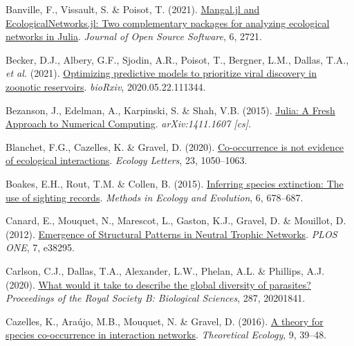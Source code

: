 \documentclass[11pt]{article}
\newlength{\cslhangindent}
\newenvironment{CSLReferences}[3] %
 {%
  \setlength{\parindent}{0pt}
  \ifodd #1 \everypar{\setlength{\hangindent}{\cslhangindent}}\ignorespaces\fi
  \ifnum #2 > 0
  \setlength{\parskip}{#2\baselineskip}
  \fi
 }%
 {}
\begin{document}
\hypertarget{refs}{}
\begin{CSLReferences}{1}{0}
\leavevmode{}%
Banville, F., Vissault, S. \& Poisot, T. (2021).
\href{https://doi.org/10.21105/joss.02721}{Mangal.jl and
EcologicalNetworks.jl: Two complementary packages for analyzing
ecological networks in Julia}. \emph{Journal of Open Source Software},
6, 2721.

\leavevmode{}%
Becker, D.J., Albery, G.F., Sjodin, A.R., Poisot, T., Bergner, L.M.,
Dallas, T.A., \emph{et al.} (2021).
\href{https://doi.org/10.1101/2020.05.22.111344}{Optimizing predictive
models to prioritize viral discovery in zoonotic reservoirs}.
\emph{bioRxiv}, 2020.05.22.111344.

\leavevmode{}%
Bezanson, J., Edelman, A., Karpinski, S. \& Shah, V.B. (2015).
\href{https://arxiv.org/abs/1411.1607}{Julia: A Fresh Approach to
Numerical Computing}. \emph{arXiv:1411.1607 {[}cs{]}}.

\leavevmode{}%
Blanchet, F.G., Cazelles, K. \& Gravel, D. (2020).
\href{https://doi.org/10.1111/ele.13525}{Co-occurrence is not evidence
of ecological interactions}. \emph{Ecology Letters}, 23, 1050--1063.

\leavevmode{}%
Boakes, E.H., Rout, T.M. \& Collen, B. (2015).
\href{https://doi.org/10.1111/2041-210X.12365}{Inferring species
extinction: The use of sighting records}. \emph{Methods in Ecology and
Evolution}, 6, 678--687.

\leavevmode{}%
Canard, E., Mouquet, N., Marescot, L., Gaston, K.J., Gravel, D. \&
Mouillot, D. (2012).
\href{https://doi.org/10.1371/journal.pone.0038295}{Emergence of
Structural Patterns in Neutral Trophic Networks}. \emph{PLOS ONE}, 7,
e38295.

\leavevmode{}%
Carlson, C.J., Dallas, T.A., Alexander, L.W., Phelan, A.L. \& Phillips,
A.J. (2020). \href{https://doi.org/10.1098/rspb.2020.1841}{What would it
take to describe the global diversity of parasites?} \emph{Proceedings
of the Royal Society B: Biological Sciences}, 287, 20201841.

\leavevmode{}%
Cazelles, K., Araújo, M.B., Mouquet, N. \& Gravel, D. (2016).
\href{https://doi.org/10.1007/s12080-015-0281-9}{A theory for species
co-occurrence in interaction networks}. \emph{Theoretical Ecology}, 9,
39--48.


\end{CSLReferences}
\end{document}
